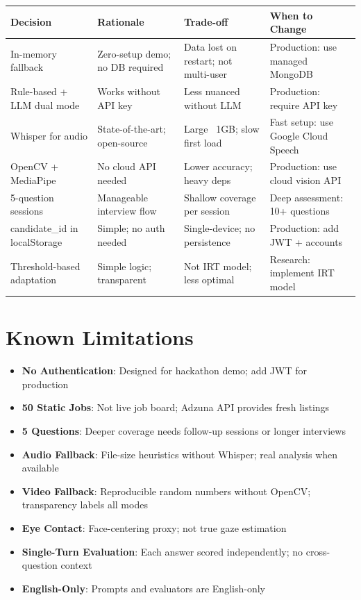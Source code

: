 \documentclass[11pt]{article}
\begin{document}
\begin{center}
\begin{tabular}{|l|p{4cm}|p{4cm}|p{3cm}|}
\hline
\textbf{Decision} & \textbf{Rationale} & \textbf{Trade-off} & \textbf{When to Change} \\
\hline
In-memory fallback & Zero-setup demo; no DB required & Data lost on restart; not multi-user & Production: use managed MongoDB \\
\hline
Rule-based + LLM dual mode & Works without API key & Less nuanced without LLM & Production: require API key \\
\hline
Whisper for audio & State-of-the-art; open-source & Large ~1GB; slow first load & Fast setup: use Google Cloud Speech \\
\hline
OpenCV + MediaPipe & No cloud API needed & Lower accuracy; heavy deps & Production: use cloud vision API \\
\hline
5-question sessions & Manageable interview flow & Shallow coverage per session & Deep assessment: 10+ questions \\
\hline
candidate\_id in localStorage & Simple; no auth needed & Single-device; no persistence & Production: add JWT + accounts \\
\hline
Threshold-based adaptation & Simple logic; transparent & Not IRT model; less optimal & Research: implement IRT model \\
\hline
\end{tabular}
\end{center}

\section{Known Limitations}

\begin{itemize}
  \item \textbf{No Authentication}: Designed for hackathon demo; add JWT for production
  \item \textbf{50 Static Jobs}: Not live job board; Adzuna API provides fresh listings
  \item \textbf{5 Questions}: Deeper coverage needs follow-up sessions or longer interviews
  \item \textbf{Audio Fallback}: File-size heuristics without Whisper; real analysis when available
  \item \textbf{Video Fallback}: Reproducible random numbers without OpenCV; transparency labels all modes
  \item \textbf{Eye Contact}: Face-centering proxy; not true gaze estimation
  \item \textbf{Single-Turn Evaluation}: Each answer scored independently; no cross-question context
  \item \textbf{English-Only}: Prompts and evaluators are English-only
\end{itemize}
\end{document}
